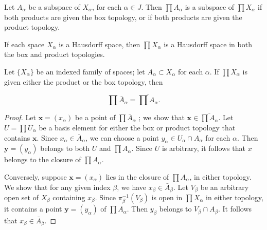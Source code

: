 \begin{theorem}
\label{thm:\thetheorem}
 Let \(A_{\alpha }\) be a subspace of \(X_{\alpha }\), for each \(\alpha \in J\). Then \(\prod {A}_{\alpha }\) is a subspace of \(\prod {X}_{\alpha }\) if both products are given the box topology, or if both products are given the product topology.

\end{theorem}

\begin{theorem}
\label{thm:\thetheorem}
 If each space \(X_{\alpha }\) is a Hausdorff space, then \(\prod {X}_{\alpha }\) is a Hausdorff space in both the box and product topologies.

\end{theorem}

\begin{theorem}
\label{thm:\thetheorem}
 Let \(\{ X_{\alpha }\}\) be an indexed family of spaces; let \(A_{\alpha } \subset {X}_{\alpha }\) for each \(\alpha\). If \(\prod {X}_{\alpha }\) is given either the product or the box topology, then

 \[
 \prod \bar{A}_{\alpha } = \overline{\prod A_{\alpha }}.
 \]
\end{theorem}

\begin{proof}
 Let \(\mathbf{x} = ( x_{\alpha })\) be a point of \(\prod {\bar{A}}_{\alpha }\) ; we show that \(\mathbf{x} \in \overline{\prod {A}_{\alpha }}\). Let \(U = \prod {U}_{\alpha }\) be a basis element for either the box or product topology that contains \(\mathbf{x}\). Since \(x_{\alpha } \in \bar{A}_{\alpha }\), we can choose a point \(y_{\alpha } \in {U}_{\alpha } \cap {A}_{\alpha }\) for each \(\alpha\). Then \(\mathbf{y} = ( y_{\alpha })\) belongs to both \(U\) and \(\prod {A}_{\alpha }\). Since \(U\) is arbitrary, it follows that \(x\) belongs to the closure of \(\prod {A}_{\alpha }\).

 Conversely, suppose \(\mathbf{x} = ( x_{\alpha })\) lies in the closure of \(\prod {A}_{\alpha }\), in either topology. We show that for any given index \(\beta\), we have \(x_{\beta } \in \bar{A}_{\beta }\). Let \(V_{\beta }\) be an arbitrary open set of \(X_{\beta }\) containing \(x_{\beta }\). Since \({\pi }_{\beta }^{-1}( V_{\beta })\) is open in \(\prod {X}_{\alpha }\) in either topology, it contains a point \(\mathbf{y} = ( y_{\alpha })\) of \(\prod {A}_{\alpha }\). Then \(y_{\beta }\) belongs to \(V_{\beta } \cap {A}_{\beta }\). It follows that \(x_{\beta } \in \bar{A}_{\beta }\).
\end{proof}

